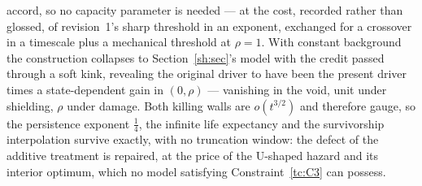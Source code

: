 \documentclass[11pt]{article}
\newcommand{\PrintRefs}{\printbibliography[title={References}]}%
\newcommand{\PrintRefs}{}%
\numberwithin{equation}{section}
\theoremstyle{plain}
\theoremstyle{definition}
\theoremstyle{remark}
\begin{document}
accord, so no
capacity parameter is needed --- at the cost, recorded rather than
glossed, of revision~1's sharp threshold in an exponent, exchanged for a
crossover in a timescale plus a mechanical threshold at $\rho=1$. With
constant background the construction collapses to Section~\ref{sh:sec}'s model
with the credit passed through a soft kink, revealing the original
driver to have been the present driver times a state-dependent gain in
$(0,\rho)$ --- vanishing in the void, unit under shielding, $\rho$ under
damage. Both killing walls are $o(t^{3/2})$ and therefore gauge, so the
persistence exponent $\tfrac14$, the infinite life expectancy and the
survivorship interpolation survive exactly, with no truncation window:
the defect of the additive treatment is repaired, at the price of the
U-shaped hazard and its interior optimum, which no model satisfying
Constraint~\ref{tc:C3} can possess.
\PrintRefs
\end{document}
